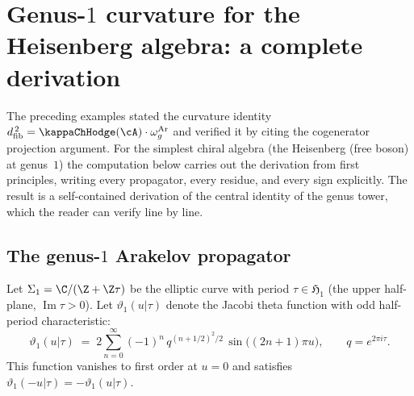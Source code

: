 \section{Genus-$1$ curvature for the Heisenberg algebra: a complete derivation}
\label{sec:heisenberg-genus-1-complete}

\providecommand{\dfib}{d_{\mathrm{fib}}}
\providecommand{\Dg}[1]{D_{#1}}
\providecommand{\Res}{\operatorname{Res}}

The preceding examples stated the curvature identity
$\dfib^{\,2} = \kappaChHodge(\cA) \cdot \omega_g^{\mathrm{Ar}}$ and verified it
by citing the cogenerator projection argument. For the simplest
chiral algebra (the Heisenberg (free boson) at genus~$1$)
the computation below carries out the derivation from first principles, writing
every propagator, every residue, and every sign explicitly. The
result is a self-contained derivation of the central identity of
the genus tower, which the reader can verify line by line.

\subsection{The genus-$1$ Arakelov propagator}
\label{subsec:arakelov-genus-1-explicit}

Let $\Sigma_1 = \C / (\Z + \Z\tau)$ be the elliptic curve with
period $\tau \in \mathfrak{H}_1$ (the upper half-plane,
$\operatorname{Im}\tau > 0$). Let $\vartheta_1(u|\tau)$ denote
the Jacobi theta function with odd half-period characteristic:
\begin{equation}\label{eq:jacobi-theta-1-def}
 \vartheta_1(u|\tau)
 \;=\;
 2\sum_{n=0}^\infty (-1)^n\, q^{(n+1/2)^2/2}\,
 \sin\bigl((2n+1)\pi u\bigr),
 \qquad
 q = e^{2\pi i \tau}.
\end{equation}
This function vanishes to first order at $u = 0$ and satisfies
$\vartheta_1(-u|\tau) = -\vartheta_1(u|\tau)$.

